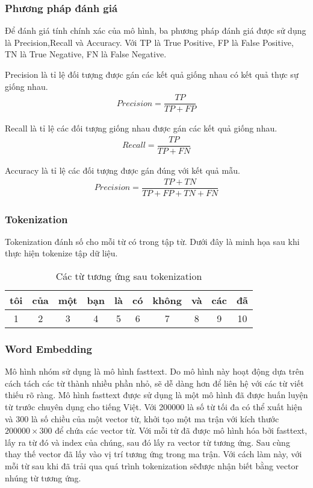 \subsubsection{Phương pháp đánh giá}
Để đánh giá tính chính xác của mô hình, ba phương pháp đánh giá được sử dụng là Precision,Recall và Accuracy. Với TP là True Positive, FP là False Positive, TN là True Negative, FN là False Negative.

Precision là tỉ lệ đối tượng được gán các kết quả giống nhau có kết quả thực sự giống nhau.
\begin{align}
    Precision=\dfrac{TP}{TP+FP}
\end{align}

Recall là tỉ lệ các đối tượng giống nhau được gán các kết quả giống nhau.
\begin{align}
    Recall=\dfrac{TP}{TP+FN}
\end{align}

Accuracy là tỉ lệ các đối tượng được gán đúng với kết quả mẫu.
\begin{align}
    Precision=\dfrac{TP+TN}{TP+FP+TN+FN}
\end{align}

\subsubsection{Tokenization}
Tokenization đánh số cho mỗi từ có trong tập từ. Dưới đây là minh họa sau khi thực hiện tokenize
tập dữ liệu.
\begin{table}[htb]
    \centering
    \caption{Các từ tương ứng sau tokenization}
    \begin{tabularx}{0.95\textwidth}{C{1}|C{1}|C{1}|C{1}|C{1}|C{1}|C{1}|C{1}|C{1}|C{1}}
        \toprule
        tôi & của & một & bạn & là & có & không & và & các & đã \\   & 2   & 3   & 4   & 5  & 6  & 7     & 8  & 9   & 10 \\
        \bottomrule
    \end{tabularx}
\end{table}

\subsubsection{Word Embedding}
Mô hình nhóm sử dụng là mô hình fasttext. Do mô hình này hoạt động dựa trên cách tách các từ thành nhiều phần nhỏ, sẽ dễ dàng hơn để liên hệ với các từ viết thiếu rõ ràng. Mô hình fasttext được sử dụng là một mô hình đã được huấn luyện từ trước chuyên dụng cho tiếng Việt. Với 200000 là số từ tối đa có thể xuất hiện và 300 là số chiều của một vector từ, khởi tạo một ma trận với kích thước $200000\times300$ để chứa các vector từ. Với mỗi từ đã được mô hình hóa bởi fasttext, lấy ra từ đó và index của chúng, sau đó lấy ra vector từ tương ứng. Sau cùng thay thế vector đã lấy vào vị trí tương ứng trong ma trận. Với cách làm này, với mỗi từ sau khi đã trải qua quá trình tokenization sẽđược nhận biết bằng vector nhúng từ tương ứng.